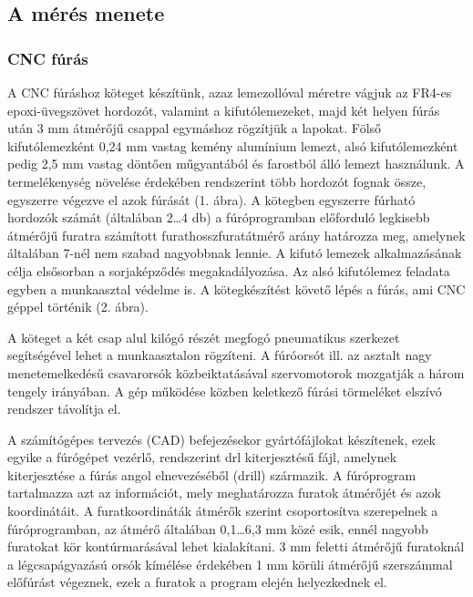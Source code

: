 \documentclass[12pt]{article}
\begin{document}
		\subsection{A mérés menete}

		\subsubsection{CNC fúrás}

		A CNC fúráshoz köteget készítünk, azaz lemezollóval méretre vágjuk az FR4-es epoxi-üvegszövet hordozót, valamint a kifutólemezeket, majd két helyen fúrás után 3 mm átmérőjű csappal egymáshoz rögzítjük a lapokat. Fölső kifutólemezként 0,24 mm vastag kemény alumínium lemezt, alsó kifutólemezként pedig 2,5 mm vastag döntően műgyantából és farostból álló lemezt használunk. A termelékenység növelése érdekében rendszerint több hordozót fognak össze, egyszerre végezve el azok fúrását (1. ábra). A kötegben egyszerre fúrható hordozók számát (általában 2…4 db) a fúróprogramban előforduló legkisebb átmérőjű furatra számított furathosszfuratátmérő arány határozza meg, amelynek általában 7-nél nem szabad nagyobbnak lennie. A kifutó lemezek alkalmazásának célja elsősorban a sorjaképződés megakadályozása. Az alsó kifutólemez feladata egyben a munkaasztal védelme is. A kötegkészítést követő lépés a fúrás, ami CNC géppel történik (2. ábra).
		



		A köteget a két csap alul kilógó részét megfogó pneumatikus szerkezet segítségével lehet a munkaasztalon rögzíteni. A fúróorsót ill. az asztalt nagy menetemelkedésű csavarorsók közbeiktatásával szervomotorok mozgatják a három tengely irányában. A gép működése közben keletkező fúrási törmeléket elszívó rendszer távolítja el.

		A számítógépes tervezés (CAD) befejezésekor gyártófájlokat készítenek, ezek egyike a fúrógépet vezérlő, rendszerint drl kiterjesztésű fájl, amelynek kiterjesztése a fúrás angol elnevezéséből (drill) származik. A fúróprogram tartalmazza azt az információt, mely meghatározza furatok átmérőjét és azok koordinátáit. A furatkoordináták átmérők szerint csoportosítva szerepelnek a fúróprogramban, az átmérő általában 0,1…6,3 mm közé esik, ennél nagyobb furatokat kör kontúrmarásával lehet kialakítani. 3 mm feletti átmérőjű furatoknál a légcsapágyazású orsók kímélése érdekében 1 mm körüli átmérőjű szerszámmal előfúrást végeznek, ezek a furatok a program elején helyezkednek el.
		
\end{document}

